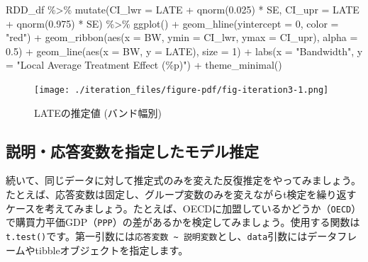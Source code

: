 \documentclass[
  a4paper,
  pandoc,
  ja=standard,
  jafont=haranoaji]{bxjsbook}
\newenvironment{Shaded}{\begin{snugshade}}{\end{snugshade}}
\newcommand{\AttributeTok}[1]{\textcolor[rgb]{0.00,0.48,0.65}{#1}}
\newcommand{\DecValTok}[1]{\textcolor[rgb]{0.68,0.00,0.00}{#1}}
\newcommand{\FloatTok}[1]{\textcolor[rgb]{0.68,0.00,0.00}{#1}}
\newcommand{\FunctionTok}[1]{\textcolor[rgb]{0.28,0.35,0.67}{#1}}
\newcommand{\NormalTok}[1]{\textcolor[rgb]{0.00,0.48,0.65}{#1}}
\newcommand{\SpecialCharTok}[1]{\textcolor[rgb]{0.37,0.37,0.37}{#1}}
\newcommand{\StringTok}[1]{\textcolor[rgb]{0.13,0.47,0.30}{#1}}
\begin{document}
\begin{Shaded}
\begin{Highlighting}[numbers=left,,]
\NormalTok{RDD\_df }\SpecialCharTok{\%\textgreater{}\%}
  \FunctionTok{mutate}\NormalTok{(}\AttributeTok{CI\_lwr =}\NormalTok{ LATE }\SpecialCharTok{+} \FunctionTok{qnorm}\NormalTok{(}\FloatTok{0.025}\NormalTok{) }\SpecialCharTok{*}\NormalTok{ SE,}
         \AttributeTok{CI\_upr =}\NormalTok{ LATE }\SpecialCharTok{+} \FunctionTok{qnorm}\NormalTok{(}\FloatTok{0.975}\NormalTok{) }\SpecialCharTok{*}\NormalTok{ SE) }\SpecialCharTok{\%\textgreater{}\%}
  \FunctionTok{ggplot}\NormalTok{() }\SpecialCharTok{+}
  \FunctionTok{geom\_hline}\NormalTok{(}\AttributeTok{yintercept =} \DecValTok{0}\NormalTok{, }\AttributeTok{color =} \StringTok{"red"}\NormalTok{) }\SpecialCharTok{+}
  \FunctionTok{geom\_ribbon}\NormalTok{(}\FunctionTok{aes}\NormalTok{(}\AttributeTok{x =}\NormalTok{ BW, }\AttributeTok{ymin =}\NormalTok{ CI\_lwr, }\AttributeTok{ymax =}\NormalTok{ CI\_upr), }\AttributeTok{alpha =} \FloatTok{0.5}\NormalTok{) }\SpecialCharTok{+}
  \FunctionTok{geom\_line}\NormalTok{(}\FunctionTok{aes}\NormalTok{(}\AttributeTok{x =}\NormalTok{ BW, }\AttributeTok{y =}\NormalTok{ LATE), }\AttributeTok{size =} \DecValTok{1}\NormalTok{) }\SpecialCharTok{+}
  \FunctionTok{labs}\NormalTok{(}\AttributeTok{x =} \StringTok{"Bandwidth"}\NormalTok{, }\AttributeTok{y =} \StringTok{"Local Average Treatment Effect (\%p)"}\NormalTok{) }\SpecialCharTok{+}
  \FunctionTok{theme\_minimal}\NormalTok{()}
\end{Highlighting}
\end{Shaded}

\begin{figure}[H]

{\centering \texttt{[image: ./iteration\_files/figure-pdf/fig-iteration3-1.png]}

}

\caption{\label{fig-iteration3}LATEの推定値 (バンド幅別)}

\end{figure}

\hypertarget{sec-iteration_variables}{%
\subsection{説明・応答変数を指定したモデル推定}\label{sec-iteration_variables}}

続いて、同じデータに対して推定式のみを変えた反復推定をやってみましょう。たとえば、応答変数は固定し、グループ変数のみを変えながらt検定を繰り返すケースを考えてみましょう。たとえば、OECDに加盟しているかどうか（\texttt{OECD}）で購買力平価GDP（\texttt{PPP}）の差があるかを検定してみましょう。使用する関数は\texttt{t.test()}です。第一引数には\texttt{応答変数\ \textasciitilde{}\ 説明変数}とし、\texttt{data}引数にはデータフレームやtibbleオブジェクトを指定します。
\end{document}

